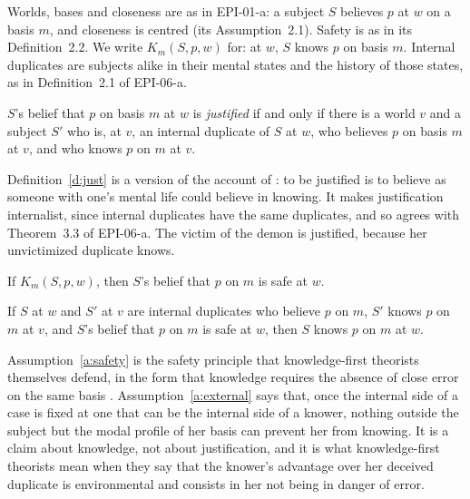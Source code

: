 \documentclass{situationist-preprint}
\begin{document}
Worlds, bases and closeness are as in EPI-01-a: a subject $S$ believes $p$ at $w$ on a basis $m$, and closeness is centred (its Assumption~2.1). Safety is as in its Definition~2.2. We write $K_m(S,p,w)$ for: at $w$, $S$ knows $p$ on basis $m$. Internal duplicates are subjects alike in their mental states and the history of those states, as in Definition~2.1 of EPI-06-a.

\begin{definition}\label{d:just}
$S$'s belief that $p$ on basis $m$ at $w$ is \emph{justified} if and only if there is a world $v$ and a subject $S'$ who is, at $v$, an internal duplicate of $S$ at $w$, who believes $p$ on basis $m$ at $v$, and who knows $p$ on $m$ at $v$.
\end{definition}

Definition~\ref{d:just} is a version of the account of \citet{Bird2007}: to be justified is to believe as someone with one's mental life could believe in knowing. It makes justification internalist, since internal duplicates have the same duplicates, and so agrees with Theorem~3.3 of EPI-06-a. The victim of the demon is justified, because her unvictimized duplicate knows.

\begin{assumption}[Safety]\label{a:safety}
If $K_m(S,p,w)$, then $S$'s belief that $p$ on $m$ is safe at $w$.
\end{assumption}

\begin{assumption}\label{a:external}
If $S$ at $w$ and $S'$ at $v$ are internal duplicates who believe $p$ on $m$, $S'$ knows $p$ on $m$ at $v$, and $S$'s belief that $p$ on $m$ is safe at $w$, then $S$ knows $p$ on $m$ at $w$.
\end{assumption}

Assumption~\ref{a:safety} is the safety principle that knowledge-first theorists themselves defend, in the form that knowledge requires the absence of close error on the same basis \citep{Williamson2000}. Assumption~\ref{a:external} says that, once the internal side of a case is fixed at one that can be the internal side of a knower, nothing outside the subject but the modal profile of her basis can prevent her from knowing. It is a claim about knowledge, not about justification, and it is what knowledge-first theorists mean when they say that the knower's advantage over her deceived duplicate is environmental and consists in her not being in danger of error.
\end{document}
